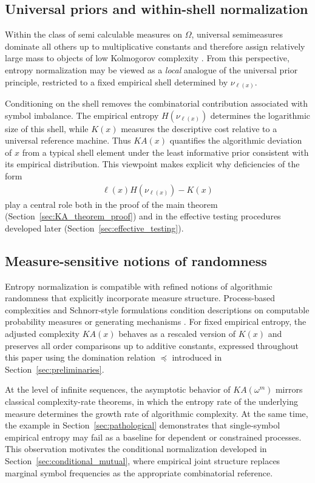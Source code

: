 \documentclass[12pt]{article}
\newcommand{\be}{\begin{eqnarray}}
\newcommand{\ee}{\end{eqnarray}}
\begin{document}
\subsection*{Universal priors and within-shell normalization}

Within the class of semi calculable measures on $\Omega$, universal
semimeasures dominate all others up to multiplicative constants and therefore
assign relatively large mass to objects of low Kolmogorov complexity
\citep{Vidakovic1988}. From this perspective, entropy normalization may be
viewed as a \emph{local} analogue of the universal prior principle, restricted
to a fixed empirical shell determined by $\nu_{\ell(x)}$.

Conditioning on the shell removes the combinatorial contribution associated
with symbol imbalance. The empirical entropy $H(\nu_{\ell(x)})$ determines the
logarithmic size of this shell, while $K(x)$ measures the descriptive cost
relative to a universal reference machine. Thus $KA(x)$ quantifies the
algorithmic deviation of $x$ from a typical shell element under the least
informative prior consistent with its empirical distribution. This viewpoint
makes explicit why deficiencies of the form
\be
\ell(x)H(\nu_{\ell(x)})-K(x)
\label{eq:deficiency_recalled_algo}
\ee
play a central role both in the proof of the main theorem
(Section~\ref{sec:KA_theorem_proof}) and in the effective testing procedures
developed later (Section~\ref{sec:effective_testing}).

\subsection*{Measure-sensitive notions of randomness}

Entropy normalization is compatible with refined notions of algorithmic
randomness that explicitly incorporate measure structure. Process-based
complexities and Schnorr-style formulations condition descriptions on
computable probability measures or generating mechanisms
\citep{Vidakovic1988}. For fixed empirical entropy, the adjusted complexity
$KA(x)$ behaves as a rescaled version of $K(x)$ and preserves all order
comparisons up to additive constants, expressed throughout this paper using
the domination relation $\preceq$ introduced in
Section~\ref{sec:preliminaries}.

At the level of infinite sequences, the asymptotic behavior of
$KA(\omega^{m})$ mirrors classical complexity-rate theorems, in which the
entropy rate of the underlying measure determines the growth rate of
algorithmic complexity. At the same time, the example in
Section~\ref{sec:pathological} demonstrates that single-symbol empirical
entropy may fail as a baseline for dependent or constrained processes. This
observation motivates the conditional normalization developed in
Section~\ref{sec:conditional_mutual}, where empirical joint structure replaces
marginal symbol frequencies as the appropriate combinatorial reference.
\end{document}
